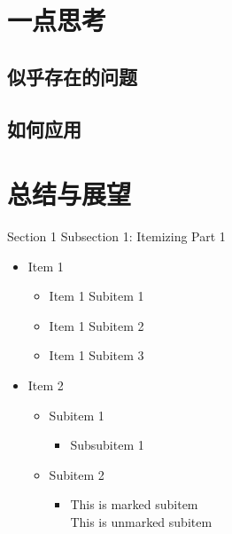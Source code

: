 \documentclass[aspectratio=169, 9pt]{beamer}
\begin{document}
\section{一点思考}
\subsection{似乎存在的问题}
\subsection{如何应用}












\section{总结与展望}








\begin{frame}{Section 1 Subsection 1: Itemizing Part 1}
    \begin{itemize}
     \setlength{\itemsep}{10pt}
        \item Item 1
        \begin{itemize}
            \item Item 1 Subitem 1
            \item Item 1 Subitem 2
            \item Item 1 Subitem 3
        \end{itemize}
        \item Item 2
        \begin{itemize}
            \item Subitem 1
            \begin{itemize}
                \item Subsubitem 1
            \end{itemize}
            \item Subitem 2
            \begin{itemize}
                \item This is marked subitem \\
                This is unmarked subitem
            \end{itemize}
        \end{itemize}
    \end{itemize}
\end{frame}
\end{document}
